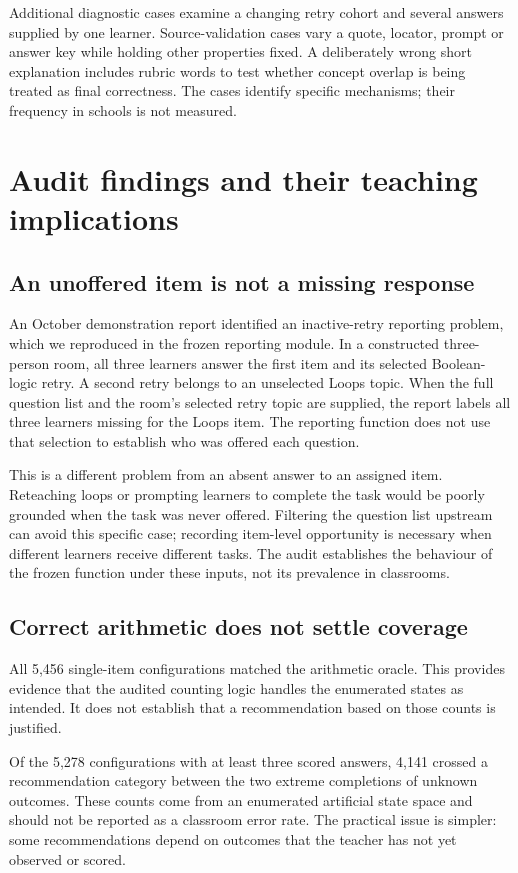 Additional diagnostic cases examine a changing retry cohort and several answers supplied by one learner. Source-validation cases vary a quote, locator, prompt or answer key while holding other properties fixed. A deliberately wrong short explanation includes rubric words to test whether concept overlap is being treated as final correctness. The cases identify specific mechanisms; their frequency in schools is not measured.

\section{Audit findings and their teaching implications}
\subsection{An unoffered item is not a missing response}
An October demonstration report identified an inactive-retry reporting problem, which we reproduced in the frozen reporting module. In a constructed three-person room, all three learners answer the first item and its selected Boolean-logic retry. A second retry belongs to an unselected Loops topic. When the full question list and the room's selected retry topic are supplied, the report labels all three learners missing for the Loops item. The reporting function does not use that selection to establish who was offered each question.

This is a different problem from an absent answer to an assigned item. Reteaching loops or prompting learners to complete the task would be poorly grounded when the task was never offered. Filtering the question list upstream can avoid this specific case; recording item-level opportunity is necessary when different learners receive different tasks. The audit establishes the behaviour of the frozen function under these inputs, not its prevalence in classrooms.

\subsection{Correct arithmetic does not settle coverage}
All 5,456 single-item configurations matched the arithmetic oracle. This provides evidence that the audited counting logic handles the enumerated states as intended. It does not establish that a recommendation based on those counts is justified.

Of the 5,278 configurations with at least three scored answers, 4,141 crossed a recommendation category between the two extreme completions of unknown outcomes. These counts come from an enumerated artificial state space and should not be reported as a classroom error rate. The practical issue is simpler: some recommendations depend on outcomes that the teacher has not yet observed or scored.

